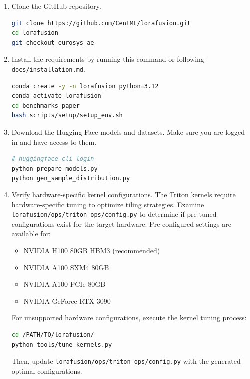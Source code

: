 \begin{enumerate}
    \item Clone the GitHub repository.
    \vspace{3pt}
\begin{lstlisting}[language=bash]
git clone https://github.com/CentML/lorafusion.git
cd lorafusion
git checkout eurosys-ae
\end{lstlisting}

    \item Install the requirements by running this command or following \texttt{docs/installation.md}.
    \vspace{3pt}
\begin{lstlisting}[language=bash]
conda create -y -n lorafusion python=3.12
conda activate lorafusion
cd benchmarks_paper
bash scripts/setup/setup_env.sh
\end{lstlisting}

    \item Download the Hugging Face models and datasets. Make sure you are logged in and have access to them.
    \vspace{3pt}
\begin{lstlisting}[language=bash]
# huggingface-cli login
python prepare_models.py
python gen_sample_distribution.py
\end{lstlisting}

    \item Verify hardware-specific kernel configurations. The Triton kernels require hardware-specific tuning to optimize tiling strategies. Examine \texttt{lorafusion/ops/triton\_ops/config.py} to determine if pre-tuned configurations exist for the target hardware. Pre-configured settings are available for:
    \begin{itemize}
        \item NVIDIA H100 80GB HBM3 (recommended)
        \item NVIDIA A100 SXM4 80GB
        \item NVIDIA A100 PCIe 80GB
        \item NVIDIA GeForce RTX 3090
    \end{itemize}
    For unsupported hardware configurations, execute the kernel tuning process:
    \vspace{3pt}
\begin{lstlisting}[language=bash]
cd /PATH/TO/lorafusion/
python tools/tune_kernels.py
\end{lstlisting}
    Then, update \texttt{lorafusion/ops/triton\_ops/config.py} with the generated optimal configurations.
\end{enumerate}

